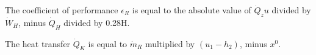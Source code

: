 The coefficient of performance \( \epsilon_R \) is equal to the absolute value of \( \dot{Q}_zu \) divided by \( \dot{W}_H \), minus \( \dot{Q}_H \) divided by 0.28H.  

The heat transfer \( \dot{Q}_K \) is equal to \( \dot{m}_R \) multiplied by \( (u_1 - h_2) \), minus \( x^0 \).